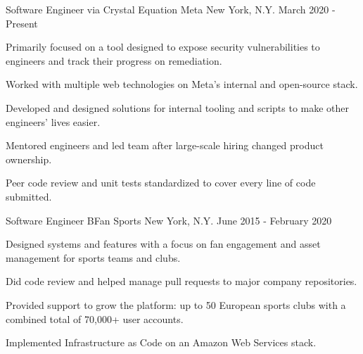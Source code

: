 

\begin{cventries}

	\cventry
		{Software Engineer via Crystal Equation} %
		{Meta} %
		{New York, N.Y.} %
		{March 2020 - Present} %
		{
			\begin{cvitems} %
				\item {Primarily focused on a tool designed to expose security vulnerabilities to engineers and track their progress on remediation.}
				\item {Worked with multiple web technologies on Meta's internal and open-source stack.}
				\item {Developed and designed solutions for internal tooling and scripts to make other engineers' lives easier.}
				\item {Mentored engineers and led team after large-scale hiring changed product ownership.}
				\item {Peer code review and unit tests standardized to cover every line of code submitted.}
			\end{cvitems}
		}

	\cventry
		{Software Engineer} %
		{BFan Sports} %
		{New York, N.Y.} %
		{June 2015 - February 2020} %
		{
			\begin{cvitems} %
				\item {Designed systems and features with a focus on fan engagement and asset management for sports teams and clubs.}
				\item {Did code review and helped manage pull requests to major company repositories.}
				\item {Provided support to grow the platform: up to 50 European sports clubs with a combined total of 70,000+ user accounts.}
				\item {Implemented Infrastructure as Code on an Amazon Web Services stack.}
			\end{cvitems}
		}


\end{cventries}
